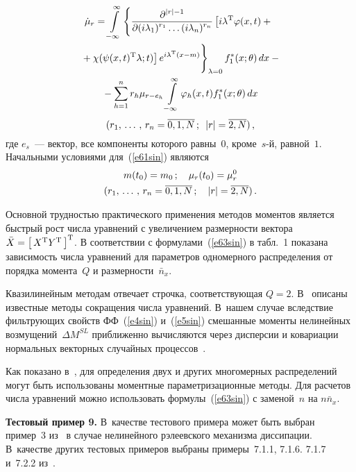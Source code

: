 \begin{multicols}{2}
    \noindent
\begin{multline*}
{\dot\mu}_r =\iii_{-\infty}^\infty \left\{ \fr{\partial^{\vert  r\vert-1}}{\partial (i\lambda_1)^{r_1}\ldots
    (i\lambda_n)^{r_n}}
\left [ i\lambda^{\mathrm{T}} \varphi(x,t) +{}\right.\right.\\
\left.\left.{}+\chi(\psi(x,t)^{\mathrm{T}}     \lambda;t)\right ] e^{i\lambda^{\mathrm{T}}(x-m)}
\vphantom{\fr{\partial^{\vert  r\vert-1}}{\partial (i\lambda_1)^{r_1}\ldots
    (i\lambda_n)^{r_n}}}
    \right\}_{\lambda=0}
 f_1^*(x;\theta)\, dx -{}\\
 {}- \sss_{h=1}^n r_h \mu_{r-e_h}
    \iii_{-\infty}^\infty \varphi_h (x,t) f_1^*(x;\theta)\,dx
    \end{multline*}
    $$
    (r_1,\,\ldots\,,\, r_n =\overline{0,1, N}\,;\enskip \vert r\vert=\overline{2,N})\,,
    $$
где $e_s$~--- вектор, все компоненты
которого рав\-ны~$0$, кро\-ме~$s$-й, рав\-ной~$1$. Начальными условиями для~(\ref{e61sin}) являются
\begin{multline*}
m(t_0) = m_0\,; \quad \mu_r(t_0) = \mu_r^0\\ 
(r_1,\,\ldots\,,\, r_n =\overline{0,1,N}\,;\quad \vert r\vert=\overline{2,N})\,. 
\end{multline*}

Основной трудностью практического применения
методов моментов является быстрый рост чис\-ла уравнений с увеличением размерности вектора
$\bar X=\left[\, X^{\mathrm{T}} Y^{\mathrm{T}}\,\right]^{\mathrm{T}}$. В соответствии с формулами~(\ref{e63sin}) в табл.~1 
показана зависимость числа уравнений для параметров одномерного распределения от порядка момента~$Q$ и 
размерности~$\bar n_x$.


Квазилинейным методам отвечает строчка, соответствующая $Q=2$.
В~\cite{7sin, 8sin} описаны известные методы сокращения числа уравнений. В~нашем случае вследствие фильтрующих 
свойств ФФ~(\ref{e4sin})
и~(\ref{e5sin}) смешанные моменты нелинейных возмущений~$\Delta M^{SL}$ приближенно вычисляются через дисперсии
и ковариации нормальных векторных случайных процессов~\cite{7sin, 8sin}.

Как показано в~\cite{7sin, 8sin}, для определения двух и других многомерных распределений могут быть использованы моментные параметризационные методы.
Для расчетов числа уравнений можно использовать формулы~(\ref{e63sin}) с заменой~$n$ на $n\bar n_x$.

\smallskip

\noindent
\textbf{Тестовый пример 9.} 
В~качестве тестового примера может быть выбран пример~3 из~\cite{2sin, 3sin} 
в случае нелинейного рэлеевского механизма диссипации.
В~качестве других тестовых примеров выбраны примеры~7.1.1, 7.1.6. 7.1.7 и~7.2.2 из~\cite{7sin}.


\end{multicols}
